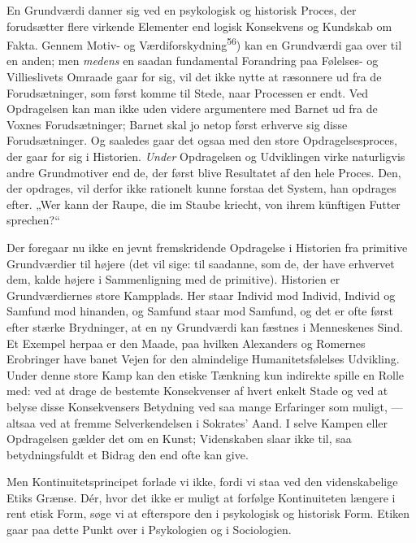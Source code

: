 \documentclass[12pt,a4paper,openany]{book}
\newcommand{\opage}[1]{\marginnote{\footnotesize\textit{[#1]}}}
\begin{document}
En Grundværdi danner sig ved en psykologisk og historisk Proces, der
forudsætter flere virkende Elementer end logisk Konsekvens og Kundskab om
Fakta. Gennem Motiv- og Værdiforskydning\textsuperscript{56}) kan en Grundværdi
gaa over til en anden; men \textit{medens} en saadan fundamental Forandring paa
Følelses- og Villieslivets Omraade gaar for sig, vil det ikke nytte at
ræsonnere ud fra de Forudsætninger, som først komme til Stede, naar Processen
er endt. Ved Opdragelsen kan man ikke uden videre argumentere med Barnet ud fra
de Voxnes Forudsætninger; Barnet skal jo netop først erhverve sig disse
Forudsætninger. Og saaledes gaar det ogsaa med den store Opdragelsesproces, der
gaar for sig i Historien. \textit{Under} Opdragelsen og Udviklingen virke
naturligvis andre Grundmotiver end de, der først blive Resultatet af den hele
Proces. Den, der opdrages, vil derfor ikke rationelt kunne forstaa det System,
han opdrages efter. „Wer kann der Raupe, die im Staube kriecht, von ihrem
künftigen Futter sprechen?“

Der foregaar nu ikke en jevnt fremskridende Opdragelse i Historien fra
primitive Grundværdier til højere (det vil sige: til saadanne, som de, der have
erhvervet dem, kalde højere i Sammenligning med de primitive). Historien er
Grundværdiernes store Kampplads. Her staar Individ mod Individ, Individ og
Samfund mod hinanden, og Samfund staar mod Samfund, og det er ofte først efter
stærke Brydninger, at en ny Grundværdi kan fæstnes i Menneskenes Sind. Et
Exempel herpaa er den Maade, paa hvilken Alexanders og Romernes Erobringer have
banet Vejen for den almindelige Humanitetsfølelses Udvikling. Under denne store
Kamp kan den etiske Tænkning kun indirekte spille en Rolle med: ved at drage de
bestemte Konsekvenser af hvert enkelt Stade og ved at belyse disse
Konsekvensers Betydning ved saa mange Erfaringer som muligt, --- altsaa ved at
fremme Selverkendelsen i Sokrates' Aand. I selve Kampen eller Opdragelsen
gælder det om en Kunst; Videnskaben slaar ikke til, saa betydningsfuldt et
Bidrag den end ofte kan give.

Men Kontinuitetsprincipet forlade vi ikke, fordi vi staa ved
\opage{77}den videnskabelige Etiks Grænse. Dér, hvor det ikke er muligt at
forfølge Kontinuiteten længere i rent etisk Form, søge vi at efterspore den i
psykologisk og historisk Form. Etiken gaar paa dette Punkt over i Psykologien
og i Sociologien.
\end{document}
